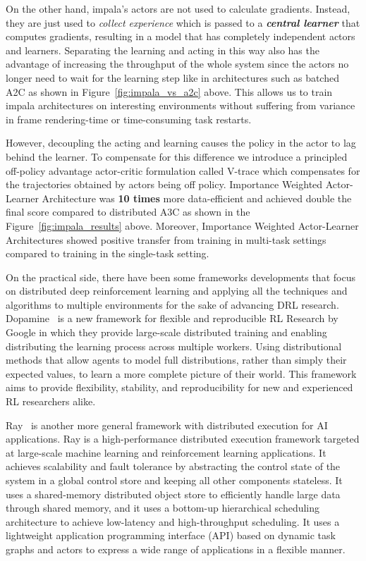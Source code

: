 On the other hand, impala's actors are not used to calculate gradients. Instead, they are just used to \textit{collect experience} which is passed to a \textit{\textbf{central learner}} that computes gradients, resulting in a model that has completely independent actors and learners. Separating the learning and acting in this way also has the advantage of increasing the throughput of the whole system since the actors no longer need to wait for the learning step like in architectures such as batched A2C as shown in Figure~\ref{fig:impala_vs_a2c} above. This allows us to train impala architectures on interesting environments without suffering from variance in frame rendering-time or time-consuming task restarts.

However, decoupling the acting and learning causes the policy in the actor to lag behind the learner. To compensate for this difference we introduce a principled off-policy advantage actor-critic formulation called V-trace which compensates for the trajectories obtained by actors being off policy. Importance Weighted Actor-Learner Architecture was \textbf{10 times} more data-efficient and achieved double the final score compared to distributed A3C as shown in the Figure~\ref{fig:impala_results} above. Moreover, Importance Weighted Actor-Learner Architectures showed positive transfer from training in multi-task settings compared to training in the single-task setting.


On the practical side, there have been some frameworks developments that focus on distributed deep reinforcement learning and applying all the techniques and algorithms to multiple environments for the sake of advancing DRL research. Dopamine~\parencite{castro2018dopamine} is a new framework for flexible and reproducible RL Research by Google in which they provide large-scale distributed training and enabling distributing the learning process across multiple workers. Using distributional methods that allow agents to model full distributions, rather than simply their expected values, to learn a more complete picture of their world. This framework aims to provide flexibility, stability, and reproducibility for new and experienced RL researchers alike. 

Ray~\parencite{moritz2018ray} is another more general framework with distributed execution for AI applications. Ray is a high-performance distributed execution framework targeted at large-scale machine learning and reinforcement learning applications. It achieves scalability and fault tolerance by abstracting the control state of the system in a global control store and keeping all other components stateless. It uses a shared-memory distributed object store to efficiently handle large data through shared memory, and it uses a bottom-up hierarchical scheduling architecture to achieve low-latency and high-throughput scheduling. It uses a lightweight application programming interface (API) based on dynamic task graphs and actors to express a wide range of applications in a flexible manner.